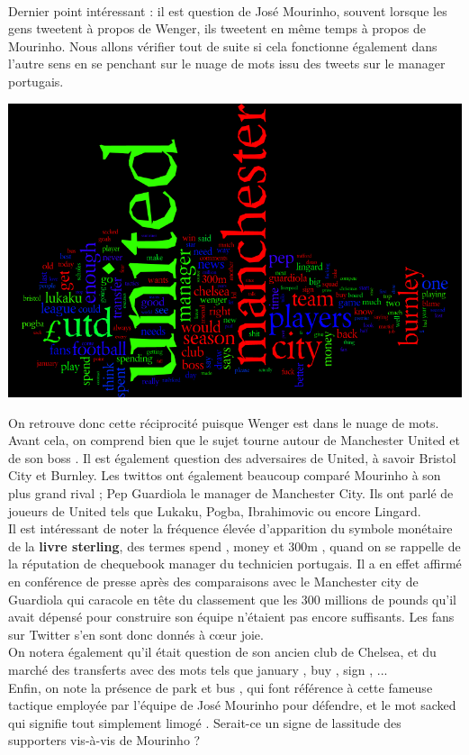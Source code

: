 \documentclass[14pt, openany]{article}
\begin{document}
\paragraph{}
Dernier point intéressant : il est question de José Mourinho, souvent lorsque les gens tweetent à propos de Wenger, ils tweetent en même temps à propos de Mourinho. Nous allons vérifier tout de suite si cela fonctionne également dans l'autre sens en se penchant sur le nuage de mots issu des tweets sur le manager portugais.
\begin{center}
\includegraphics[scale=0.6]{Images/mourinho_words.png}
\end{center}
On retrouve donc cette réciprocité puisque Wenger est dans le nuage de mots. Avant cela, on comprend bien que le sujet tourne autour de Manchester United et de son \og boss \fg{}. Il est également question des adversaires de United, à savoir Bristol City et Burnley. Les twittos ont également beaucoup comparé Mourinho à son plus grand rival ; Pep Guardiola le manager de Manchester City. Ils ont parlé de joueurs de United tels que Lukaku, Pogba, Ibrahimovic ou encore Lingard.\\
Il est intéressant de noter la fréquence élevée d'apparition du symbole monétaire de la \textbf{livre sterling}, des termes \og spend \fg{}, \og money \fg{} et \og 300m \fg{}, quand on se rappelle de la réputation de \og chequebook manager \fg{} du technicien portugais. Il a en effet affirmé en conférence de presse après des comparaisons avec le Manchester city de Guardiola qui caracole en tête du classement que les 300 millions de pounds qu'il avait dépensé pour construire son équipe n'étaient pas encore suffisants. Les fans sur Twitter s'en sont donc donnés à cœur joie.\\
On notera également qu'il était question de son ancien club de Chelsea, et du marché des transferts avec des mots tels que \og january \fg{}, \og buy \fg{}, \og sign \fg{}, ...\\
Enfin, on note la présence de \og park \fg{} et \og bus \fg{}, qui font référence à cette fameuse tactique employée par l'équipe de José Mourinho pour défendre, et le mot \og sacked \fg{} qui signifie tout simplement \og limogé \fg{}. Serait-ce un signe de lassitude des supporters vis-à-vis de Mourinho ?
\end{document}
